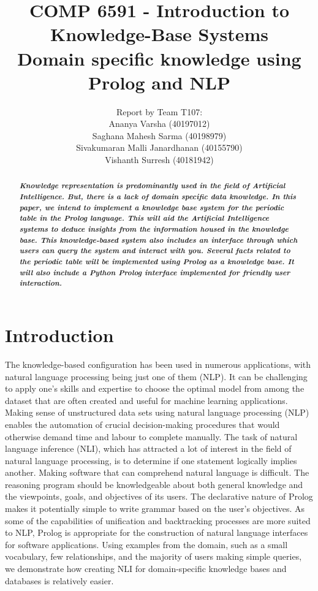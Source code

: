 \documentclass{article}
\title{\textbf{COMP 6591 - Introduction to Knowledge-Base Systems}\\[.5em]
\textbf{Domain specific knowledge using Prolog and NLP} }
\author{Report by Team T107:\\[.3em]
Ananya Varsha (40197012)\\
Saghana Mahesh Sarma (40198979)\\
Sivakumaran Malli Janardhanan (40155790)\\
Vishanth Surresh (40181942)\\
}
\begin{document}
\maketitle


\begin{abstract}\textbf{\textit{Knowledge representation is predominantly used in the field of Artificial Intelligence. But, there is a lack of domain specific data knowledge. In this paper, we intend to implement a knowledge base system for the periodic table in the Prolog language. This will aid the Artificial Intelligence systems to deduce insights from the information housed in the knowledge base. This knowledge-based system also includes an interface through which users can query the system and interact with you. Several facts related to the periodic table will be implemented using Prolog as a knowledge base. It will also include a Python Prolog interface implemented for friendly user interaction.}}

\end{abstract}

\section{Introduction}
The knowledge-based configuration has been used in numerous applications, with natural language processing being just one of them (NLP). It can be challenging to apply one's skills and expertise to choose the optimal model from among the dataset that are often created and useful for machine learning applications. Making sense of unstructured data sets using natural language processing (NLP) enables the automation of crucial decision-making procedures that would otherwise demand time and labour to complete manually. The task of natural language inference (NLI), which has attracted a lot of interest in the field of natural language processing, is to determine if one statement logically implies another. Making software that can comprehend natural language is difficult.\cite{rohil2018natural} The reasoning program should be knowledgeable about both general knowledge and the viewpoints, goals, and objectives of its users. The declarative nature of Prolog makes it potentially simple to write grammar based on the user's objectives. As some of the capabilities of unification and backtracking processes are more suited to NLP, Prolog is appropriate for the construction of natural language interfaces for software applications. Using examples from the domain, such as a small vocabulary, few relationships, and the majority of users making simple queries, we demonstrate how creating NLI for domain-specific knowledge bases and databases is relatively easier.
\end{document}
